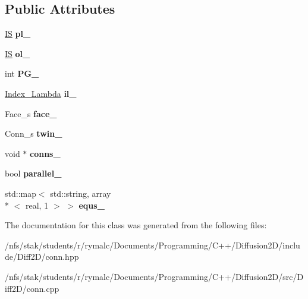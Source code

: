 \subsection*{Public Attributes}
\begin{DoxyCompactItemize}
\item 
\hypertarget{classConn_a61c9d519b93b91a14b4cc47a8cb8980b}{\hyperlink{structIS}{I\+S} {\bfseries pl\+\_\+}}\label{classConn_a61c9d519b93b91a14b4cc47a8cb8980b}

\item 
\hypertarget{classConn_a949773005bd6449b09e355e8f78dee47}{\hyperlink{structIS}{I\+S} {\bfseries ol\+\_\+}}\label{classConn_a949773005bd6449b09e355e8f78dee47}

\item 
\hypertarget{classConn_a8550bde616100c5f9cc23bc7ae267a18}{int {\bfseries P\+G\+\_\+}}\label{classConn_a8550bde616100c5f9cc23bc7ae267a18}

\item 
\hypertarget{classConn_a659caee9d9a125f24d7eb054ca2e5879}{\hyperlink{structIndex__Lambda}{Index\+\_\+\+Lambda} {\bfseries il\+\_\+}}\label{classConn_a659caee9d9a125f24d7eb054ca2e5879}

\item 
\hypertarget{classConn_a893abc608e559f12c5368edbd6da7b54}{Face\+\_\+s {\bfseries face\+\_\+}}\label{classConn_a893abc608e559f12c5368edbd6da7b54}

\item 
\hypertarget{classConn_a7578b2f58e208173f45436d7261271a0}{Conn\+\_\+s {\bfseries twin\+\_\+}}\label{classConn_a7578b2f58e208173f45436d7261271a0}

\item 
\hypertarget{classConn_ac571dea0fa3d37ed022872da32ad6c33}{void $\ast$ {\bfseries conns\+\_\+}}\label{classConn_ac571dea0fa3d37ed022872da32ad6c33}

\item 
\hypertarget{classConn_aae3bc6691f2e065bf44e8f1a2cd4e31f}{bool {\bfseries parallel\+\_\+}}\label{classConn_aae3bc6691f2e065bf44e8f1a2cd4e31f}

\item 
\hypertarget{classConn_a425d7d5713a82acbfa9a69adcc0c1c25}{std\+::map$<$ std\+::string, array\\*
$<$ real, 1 $>$ $>$ {\bfseries equs\+\_\+}}\label{classConn_a425d7d5713a82acbfa9a69adcc0c1c25}

\end{DoxyCompactItemize}


The documentation for this class was generated from the following files\+:\begin{DoxyCompactItemize}
\item 
/nfs/stak/students/r/rymalc/\+Documents/\+Programming/\+C++/\+Diffusion2\+D/include/\+Diff2\+D/conn.\+hpp\item 
/nfs/stak/students/r/rymalc/\+Documents/\+Programming/\+C++/\+Diffusion2\+D/src/\+Diff2\+D/conn.\+cpp\end{DoxyCompactItemize}
